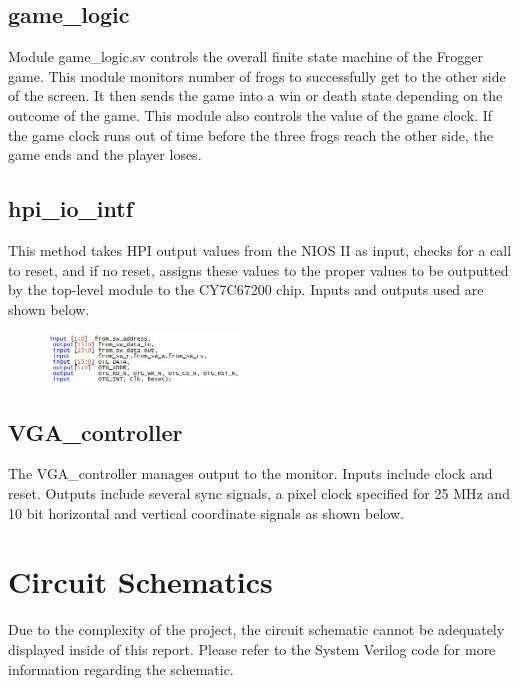 \documentclass[journal, twocolumn, final,11pt,letterpaper]{IEEEtran}
\begin{document}
	\subsection{game\_logic}
	Module game\_logic.sv controls the overall finite state machine of the Frogger game.  This module monitors number of frogs to successfully get to the other side of the screen.  It then sends the game into a win or death state depending on the outcome of the game.  This module also controls the value of the game clock.  If the game clock runs out of time before the three frogs reach the other side, the game ends and the player loses. 
	
	\subsection{hpi\_io\_intf}
	This method takes HPI output values from the NIOS II as input, checks for a call to reset, and if no reset, assigns these values to the proper values to be outputted by the top-level module to the CY7C67200 chip.  Inputs and outputs used are shown below. 
	
	\begin{figure}[h]
		\centering
		\includegraphics[width=0.45\textwidth]{hpiio.jpg}
		\label{fig:hpiio}
	\end{figure}
	
	\subsection{VGA\_controller}
	The VGA\_controller manages output to the monitor.  Inputs include clock and reset. Outputs include several sync signals, a pixel clock specified for 25 MHz and 10 bit horizontal and vertical coordinate signals as shown below.
	


	
\section{Circuit Schematics}
Due to the complexity of the project, the circuit schematic cannot be adequately displayed inside of this report. Please refer to the System Verilog code for more information regarding the schematic.
\end{document}
